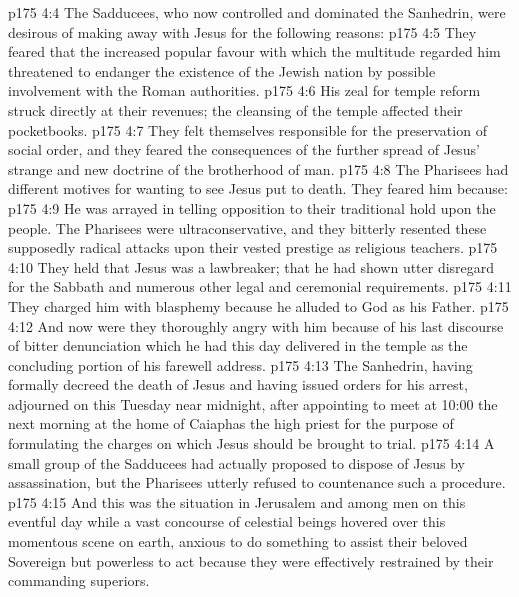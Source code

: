 \vs p175 4:4 The Sadducees, who now controlled and dominated the Sanhedrin, were desirous of making away with Jesus for the following reasons:
\vs p175 4:5 \bibnobreakspace They feared that the increased popular favour with which the multitude regarded him threatened to endanger the existence of the Jewish nation by possible involvement with the Roman authorities.
\vs p175 4:6 \bibnobreakspace His zeal for temple reform struck directly at their revenues; the cleansing of the temple affected their pocketbooks.
\vs p175 4:7 \bibnobreakspace They felt themselves responsible for the preservation of social order, and they feared the consequences of the further spread of Jesus’ strange and new doctrine of the brotherhood of man.
\vs p175 4:8 \pc The Pharisees had different motives for wanting to see Jesus put to death. They feared him because:
\vs p175 4:9 \bibnobreakspace He was arrayed in telling opposition to their traditional hold upon the people. The Pharisees were ultraconservative, and they bitterly resented these supposedly radical attacks upon their vested prestige as religious teachers.
\vs p175 4:10 \bibnobreakspace They held that Jesus was a lawbreaker; that he had shown utter disregard for the Sabbath and numerous other legal and ceremonial requirements.
\vs p175 4:11 \bibnobreakspace They charged him with blasphemy because he alluded to God as his Father.
\vs p175 4:12 \bibnobreakspace And now were they thoroughly angry with him because of his last discourse of bitter denunciation which he had this day delivered in the temple as the concluding portion of his farewell address.
\vs p175 4:13 \pc The Sanhedrin, having formally decreed the death of Jesus and having issued orders for his arrest, adjourned on this Tuesday near midnight, after appointing to meet at 10:00 the next morning at the home of Caiaphas the high priest for the purpose of formulating the charges on which Jesus should be brought to trial.
\vs p175 4:14 A small group of the Sadducees had actually proposed to dispose of Jesus by assassination, but the Pharisees utterly refused to countenance such a procedure.
\vs p175 4:15 \pc And this was the situation in Jerusalem and among men on this eventful day while a vast concourse of celestial beings hovered over this momentous scene on earth, anxious to do something to assist their beloved Sovereign but powerless to act because they were effectively restrained by their commanding superiors.
\quizlink
